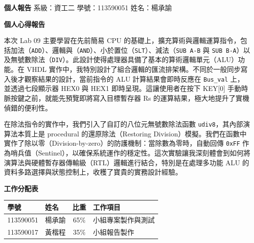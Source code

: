 \documentclass[12pt, a4paper]{article}
\begin{document}
\noindent
\textbf{個人報告} \hfill 系級：資工二 \quad 學號：113590051 \quad 姓名：楊承諭

\vspace{1.5em}
\begin{center}
    {\Large \textbf{個人心得報告}}
\end{center}
\vspace{1em}

本次 Lab 09 主要學習在先前簡易 CPU 的基礎上，擴充算術與邏輯運算指令，包括加法（\texttt{ADD}）、邏輯與（\texttt{AND}）、小於置位（\texttt{SLT}）、減法（\texttt{SUB A-B} 與 \texttt{SUB B-A}）以及無號數除法（\texttt{DIV}）。此設計使得處理器具備了基本的算術邏輯單元（ALU）功能。在 VHDL 實作中，我特別設計了組合邏輯的匯流排架構。不同於一般同步寫入後才觀察結果的設計，當前指令的 ALU 計算結果會即時反應在 \texttt{Bus\_val} 上，並透過七段顯示器 HEX0 與 HEX1 即時呈現。這讓使用者在按下 KEY[0] 手動時脈按鍵之前，就能先預覽即將寫入目標暫存器 Rs 的運算結果，極大地提升了實機偵錯的便利性。

在除法指令的實作中，我們引入了自訂的八位元無號數除法函數 \texttt{udiv8}，其內部演算法本質上是 procedural 的還原除法（Restoring Division）模擬。我們在函數中實作了除以零（Division-by-zero）的防護機制：當除數為零時，自動回傳 \texttt{0xFF} 作為哨兵值（Sentinel），以確保系統運作的穩定性。這次實驗讓我深刻體會到如何將演算法與硬體暫存器傳輸級（RTL）邏輯進行結合，特別是在處理多功能 ALU 的資料多路選擇與狀態控制上，收穫了寶貴的實務設計經驗。

\vspace{2em}
\noindent
\textbf{工作分配表}
\vspace{0.5em}

\begin{table}[H]
    \centering
    \begin{tabular}{llcl}
        \toprule
        \textbf{學號} & \textbf{姓名} & \textbf{比重} & \textbf{工作項目} \\ \midrule
        113590051 & 楊承諭 & 65\% & 小組專案製作與測試 \\
        113590017 & 黃楷程 & 35\% & 小組報告製作 \\ \bottomrule
    \end{tabular}
\end{table}
\end{document}
